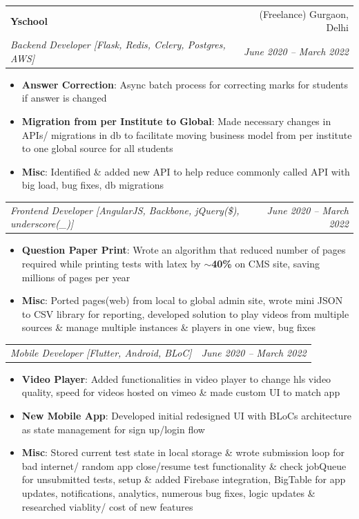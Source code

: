 \documentclass[letterpaper,11pt]{article}
\makeatletter
\newcommand{\resumeItem}[2]{
  \item\small{
    \textbf{#1}{: #2 \vspace{-2pt}}
  }
}
\newcommand{\resumeSubheading}[4]{
  \vspace{-1pt}\item
    \begin{tabular*}{0.97\textwidth}[t]{l@{\extracolsep{\fill}}r}
      \textbf{#1} & #2 \\
      \textit{\small#3} & \textit{\small #4} \\
    \end{tabular*}\vspace{-5pt}
}
\newcommand{\resumeSubSubheading}[2]{
    \begin{tabular*}{0.97\textwidth}{l@{\extracolsep{\fill}}r}
      \textit{\small#1} & \textit{\small #2} \\
    \end{tabular*}\vspace{-5pt}
}
\newcommand{\resumeItemListStart}{\begin{itemize}}
\newcommand{\resumeItemListEnd}{\end{itemize}\vspace{-5pt}}
\makeatother
\begin{document}
    \resumeSubheading
      {Yschool}{(Freelance) Gurgaon, Delhi}
      {Backend Developer [Flask, Redis, Celery, Postgres, AWS]}{June 2020 -- March 2022}
      \resumeItemListStart
        \resumeItem{Answer Correction}
          {Async batch process for correcting marks for students if answer is changed}
        \resumeItem{Migration from per Institute to Global}
          {Made necessary changes in APIs/ migrations in db to facilitate moving business model from per institute to one global source for all students}
        \resumeItem{Misc}
          {Identified \& added new API to help reduce commonly called API with big load, bug fixes, db migrations}
      \resumeItemListEnd
      
   \resumeSubSubheading
    {Frontend Developer [AngularJS, Backbone, jQuery(\$), underscore(\_)]}{June 2020 -- March 2022}
    \resumeItemListStart
       \resumeItem{Question Paper Print}
         {Wrote an algorithm that reduced number of pages required while printing tests with latex by $\sim$\textbf{40\%} on CMS site, saving millions of pages per year}
      \resumeItem{Misc}
         {Ported pages(web) from local to global admin site, wrote mini JSON to CSV library for reporting, developed solution to play videos from multiple sources \& manage multiple instances \& players in one view, bug fixes}
    \resumeItemListEnd

    \resumeSubSubheading
    {Mobile Developer [Flutter, Android, BLoC]}{June 2020 -- March 2022}
    \resumeItemListStart
       \resumeItem{Video Player}
         {Added functionalities in video player to change hls video quality, speed for videos hosted on vimeo \& made custom UI to match app}
      \resumeItem{New Mobile App}
         {Developed initial redesigned UI with BLoCs architecture as state management for sign up/login flow}
      \resumeItem{Misc}
         {Stored current test state in local storage \& wrote submission loop for bad internet/ random app close/resume test functionality \& check jobQueue for unsubmitted tests, setup \& added Firebase integration, BigTable for app updates, notifications, analytics, numerous bug fixes, logic updates \& researched viablity/ cost of new features}
    \resumeItemListEnd

\end{document}
